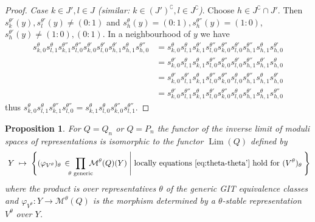 \documentclass[10pt,a4paper]{amsart}
\newtheorem{prop}[theo]{Proposition}
\theoremstyle{definition}
\def\phi{\varphi}
\DeclareMathOperator{\Lim}{Lim}
\begin{document}
\begin{proof}
\emph{Case $k\in J',l\in J$ (similar: $k\in(J')^\complement, l\in J^\complement$)}.
Choose $h\in J^\complement\cap J'$.
Then $s^{\theta'}_k(y),s^{\theta'}_l(y)\neq (0:1)$ and
$s^\theta_h(y)=(0:1),s^{\theta''}_h(y)=(1:0)$, 
$s^{\theta'}_h(y)\neq (1:0),(0:1)$.
In a neighbourhood of $y$ we have
\[
\begin{aligned}
s^\theta_{k,0}s^\theta_{l,1}s^{\theta''}_{k,1}s^{\theta''}_{l,0}
s^{\theta'}_{k,0}s^{\theta'}_{l,0}
s^{\theta'}_{h,1}s^\theta_{h,1}s^{\theta''}_{h,0}
&=s^\theta_{k,0}s^\theta_{l,1}s^{\theta'}_{k,1}s^{\theta''}_{l,0}
s^{\theta''}_{k,0}s^{\theta'}_{l,0}
s^{\theta''}_{h,1}s^\theta_{h,1}s^{\theta'}_{h,0}\\
&=s^{\theta'}_{k,0}s^\theta_{l,1}s^\theta_{k,1}s^{\theta''}_{l,0}
s^{\theta''}_{k,0}s^{\theta'}_{l,0}
s^{\theta''}_{h,1}s^{\theta'}_{h,1}s^\theta_{h,0}\\
&=s^{\theta'}_{k,0}s^{\theta'}_{l,1}s^\theta_{k,1}s^{\theta''}_{l,0}
s^{\theta''}_{k,0}s^\theta_{l,0}
s^{\theta''}_{h,1}s^\theta_{h,1}s^{\theta'}_{h,0}\\
&=s^{\theta'}_{k,0}s^{\theta''}_{l,1}s^\theta_{k,1}s^{\theta'}_{l,0}
s^{\theta''}_{k,0}s^\theta_{l,0}
s^{\theta'}_{h,1}s^\theta_{h,1}s^{\theta''}_{h,0}
\end{aligned}
\]
thus 
$s^\theta_{k,0}s^\theta_{l,1}s^{\theta''}_{k,1}s^{\theta''}_{l,0}
=s^\theta_{k,1}s^\theta_{l,0}s^{\theta''}_{k,0}s^{\theta''}_{l,1}$.
\end{proof}


\begin{prop}\label{prop:functorinvlimQnPn}
For $Q=Q_n$ or $Q=P_n$ the functor of the inverse limit of moduli spaces
of representations is isomorphic to the functor $\Lim(Q)$ defined by
\begin{equation}\label{eq:functorinvlimQnPn}
\;Y\;\mapsto\;
\Bigg\{
(\phi_{V^\theta})_\theta\,\in\!\!\!\prod_{\text{$\theta$ generic}}\!\!\!\!
\mathcal M^\theta(Q)(Y)
\;\Bigg|\;
\text{locally equations~\eqref{eq:theta-theta'} hold for $(V^\theta)_\theta$}\:
\Bigg\}
\end{equation}
where the product is over representatives $\theta$ of the generic GIT equivalence classes
and $\phi_{V^\theta}\colon Y\to\mathcal M^\theta(Q)$ is the morphism determined by a
$\theta$-stable representation $V^\theta$ over $Y$.
\end{prop}
\end{document}
